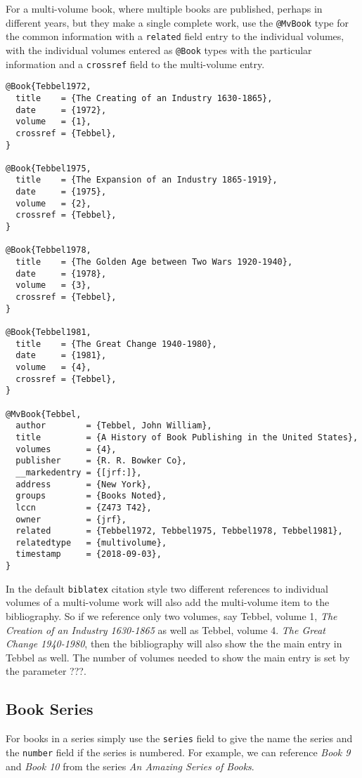 \documentclass{article}
\begin{document}
For a multi-volume book, where multiple books are published,
perhaps in different years, but they make a single complete work,
use the {\tt @MvBook} type for the common information with a {\tt related}
field entry to the individual volumes, with the individual volumes entered
as {\tt @Book} types with the particular
information and a {\tt crossref} field to the multi-volume entry.

\begin{verbatim}
@Book{Tebbel1972,
  title    = {The Creating of an Industry 1630-1865},
  date     = {1972},
  volume   = {1},
  crossref = {Tebbel},
}

@Book{Tebbel1975,
  title    = {The Expansion of an Industry 1865-1919},
  date     = {1975},
  volume   = {2},
  crossref = {Tebbel},
}

@Book{Tebbel1978,
  title    = {The Golden Age between Two Wars 1920-1940},
  date     = {1978},
  volume   = {3},
  crossref = {Tebbel},
}

@Book{Tebbel1981,
  title    = {The Great Change 1940-1980},
  date     = {1981},
  volume   = {4},
  crossref = {Tebbel},
}

@MvBook{Tebbel,
  author        = {Tebbel, John William},
  title         = {A History of Book Publishing in the United States},
  volumes       = {4},
  publisher     = {R. R. Bowker Co},
  __markedentry = {[jrf:]},
  address       = {New York},
  groups        = {Books Noted},
  lccn          = {Z473 T42},
  owner         = {jrf},
  related       = {Tebbel1972, Tebbel1975, Tebbel1978, Tebbel1981},
  relatedtype   = {multivolume},
  timestamp     = {2018-09-03},
}
\end{verbatim}

In the default {\tt biblatex} citation style two different references
to individual volumes of a multi-volume work will also add the
multi-volume item to the bibliography. So if we reference only two
volumes, say Tebbel, volume 1, {\it The Creation of an Industry
  1630-1865}\cite{Tebbel1972} as well as Tebbel, volume 4. {\it The
  Great Change 1940-1980}\cite{Tebbel1981}, then the bibliography will
also show the the main entry in Tebbel as well. The number of volumes
needed to show the main entry is set by the parameter ???.

\subsection{Book Series}

For books in a series simply use the {\tt series} field to give the
name the series and the {\tt number} field if the series is
numbered. For example, we can reference {\it Book 9} \cite{book09} and
{\it Book 10} \cite{book10} from the series {\it An Amazing Series of
  Books}.
\end{document}
